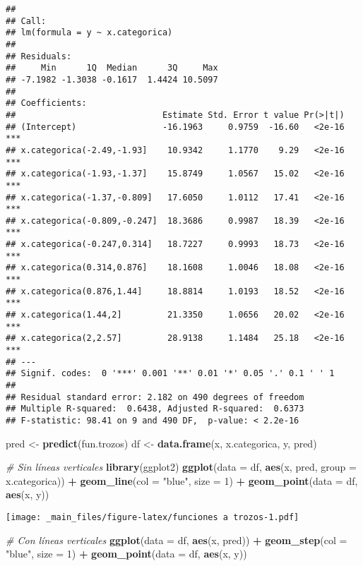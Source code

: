 \documentclass[
]{book}
\newenvironment{Shaded}{\begin{snugshade}}{\end{snugshade}}
\newcommand{\CommentTok}[1]{\textcolor[rgb]{0.56,0.35,0.01}{\textit{#1}}}
\newcommand{\DataTypeTok}[1]{\textcolor[rgb]{0.13,0.29,0.53}{#1}}
\newcommand{\DecValTok}[1]{\textcolor[rgb]{0.00,0.00,0.81}{#1}}
\newcommand{\KeywordTok}[1]{\textcolor[rgb]{0.13,0.29,0.53}{\textbf{#1}}}
\newcommand{\NormalTok}[1]{#1}
\newcommand{\OperatorTok}[1]{\textcolor[rgb]{0.81,0.36,0.00}{\textbf{#1}}}
\newcommand{\StringTok}[1]{\textcolor[rgb]{0.31,0.60,0.02}{#1}}
\begin{document}
\begin{verbatim}
## 
## Call:
## lm(formula = y ~ x.categorica)
## 
## Residuals:
##     Min      1Q  Median      3Q     Max 
## -7.1982 -1.3038 -0.1617  1.4424 10.5097 
## 
## Coefficients:
##                             Estimate Std. Error t value Pr(>|t|)    
## (Intercept)                 -16.1963     0.9759  -16.60   <2e-16 ***
## x.categorica(-2.49,-1.93]    10.9342     1.1770    9.29   <2e-16 ***
## x.categorica(-1.93,-1.37]    15.8749     1.0567   15.02   <2e-16 ***
## x.categorica(-1.37,-0.809]   17.6050     1.0112   17.41   <2e-16 ***
## x.categorica(-0.809,-0.247]  18.3686     0.9987   18.39   <2e-16 ***
## x.categorica(-0.247,0.314]   18.7227     0.9993   18.73   <2e-16 ***
## x.categorica(0.314,0.876]    18.1608     1.0046   18.08   <2e-16 ***
## x.categorica(0.876,1.44]     18.8814     1.0193   18.52   <2e-16 ***
## x.categorica(1.44,2]         21.3350     1.0656   20.02   <2e-16 ***
## x.categorica(2,2.57]         28.9138     1.1484   25.18   <2e-16 ***
## ---
## Signif. codes:  0 '***' 0.001 '**' 0.01 '*' 0.05 '.' 0.1 ' ' 1
## 
## Residual standard error: 2.182 on 490 degrees of freedom
## Multiple R-squared:  0.6438, Adjusted R-squared:  0.6373 
## F-statistic: 98.41 on 9 and 490 DF,  p-value: < 2.2e-16
\end{verbatim}

\begin{Shaded}
\begin{Highlighting}[]
\NormalTok{pred <-}\StringTok{ }\KeywordTok{predict}\NormalTok{(fun.trozos)}
\NormalTok{df <-}\StringTok{ }\KeywordTok{data.frame}\NormalTok{(x, x.categorica, y, pred)}

\CommentTok{# Sin líneas verticales}
\KeywordTok{library}\NormalTok{(ggplot2)}
\KeywordTok{ggplot}\NormalTok{(}\DataTypeTok{data =}\NormalTok{ df, }\KeywordTok{aes}\NormalTok{(x, pred, }\DataTypeTok{group =}\NormalTok{ x.categorica)) }\OperatorTok{+}\StringTok{ }
\StringTok{  }\KeywordTok{geom_line}\NormalTok{(}\DataTypeTok{col =} \StringTok{"blue"}\NormalTok{, }\DataTypeTok{size =} \DecValTok{1}\NormalTok{) }\OperatorTok{+}
\StringTok{  }\KeywordTok{geom_point}\NormalTok{(}\DataTypeTok{data =}\NormalTok{ df, }\KeywordTok{aes}\NormalTok{(x, y))}
\end{Highlighting}
\end{Shaded}

\texttt{[image: \_main\_files/figure-latex/funciones a trozos-1.pdf]}

\begin{Shaded}
\begin{Highlighting}[]
\CommentTok{# Con líneas verticales}
\KeywordTok{ggplot}\NormalTok{(}\DataTypeTok{data =}\NormalTok{ df, }\KeywordTok{aes}\NormalTok{(x, pred)) }\OperatorTok{+}\StringTok{ }
\StringTok{  }\KeywordTok{geom_step}\NormalTok{(}\DataTypeTok{col =} \StringTok{"blue"}\NormalTok{, }\DataTypeTok{size =} \DecValTok{1}\NormalTok{) }\OperatorTok{+}
\StringTok{  }\KeywordTok{geom_point}\NormalTok{(}\DataTypeTok{data =}\NormalTok{ df, }\KeywordTok{aes}\NormalTok{(x, y))}
\end{Highlighting}
\end{Shaded}
\end{document}
